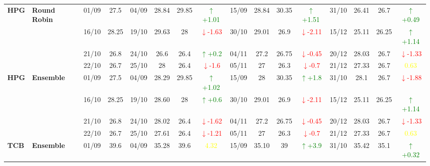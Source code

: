 \documentclass{ieeeaccess}
\begin{document}
{\begin{longtable}{llcc|cccc|cccc|cccc}
\multirow{4}{*}{\textbf{HPG}} 
& \textbf{Round Robin}
& 01/09 & 27.5 & 04/09 & 28.84 & 29.85 & \textcolor{green}{\(\uparrow\)+1.01} & 15/09 & 28.84 & 30.35 & \textcolor{green}{\(\uparrow\)+1.51} & 31/10 & 26.41 & 26.7 & \textcolor{green}{\(\uparrow\)+0.49} \\

& 
& 16/10 & 28.25 & 19/10 & 29.63 & 28 & \textcolor{red}{\(\downarrow\)-1.63} & 30/10 & 29.01 & 26.9 & \textcolor{red}{\(\downarrow\)-2.11} & 15/12 & 25.11 & 26.25 & \textcolor{green}{\(\uparrow\)+1.14} \\

& 
& 21/10 & 26.8 & 24/10 & 26.6 & 26.4 & \textcolor{green}{\(\uparrow\)+0.2} & 04/11 & 27.2 & 26.75 & \textcolor{red}{\(\downarrow\)-0.45} & 20/12 & 28.03 & 26.7 & \textcolor{red}{\(\downarrow\)-1.33} \\

&
& 22/10 & 26.7 & 25/10 & 28 & 26.4 & \textcolor{red}{\(\downarrow\)-1.6} & 05/11 & 27 & 26.3 & \textcolor{red}{\(\downarrow\)-0.7} & 21/12 & 27.33 & 26.7 & \textcolor{yellow}{0.63} \\
\midrule


\multirow{4}{*}{\textbf{HPG}} 
& \textbf{Ensemble}
& 01/09 & 27.5 & 04/09 & 28.29 & 29.85& \textcolor{green}{\(\uparrow\)+1.02} & 15/09 & 28 & 30.35 & \textcolor{green}{\(\uparrow\)+1.8} & 31/10 & 28.1 & 26.7 & \textcolor{red}{\(\downarrow\)-1.88} \\

& 
& 16/10 & 28.25 & 19/10 & 28.60 & 28 & \textcolor{green}{\(\uparrow\)+0.6} & 30/10 & 29.01 & 26.9 & \textcolor{red}{\(\downarrow\)-2.11} & 15/12 & 25.11 & 26.25 & \textcolor{green}{\(\uparrow\)+1.14} \\

& 
& 21/10 & 26.8 & 24/10 & 28.02 & 26.4 & \textcolor{red}{\(\downarrow\)-1.62} & 04/11 & 27.2 & 26.75 & \textcolor{red}{\(\downarrow\)-0.45} & 20/12 & 28.03 & 26.7 & \textcolor{red}{\(\downarrow\)-1.33} \\

&
& 22/10 & 26.7 & 25/10 & 27.61 & 26.4 & \textcolor{red}{\(\downarrow\)-1.21} & 05/11 & 27 & 26.3 & \textcolor{red}{\(\downarrow\)-0.7} & 21/12 & 27.33 & 26.7 & \textcolor{yellow}{0.63} \\
\midrule



\multirow{4}{*}{\textbf{TCB}} 
& \textbf{Ensemble}
& 01/09 & 39.6 & 04/09 & 35.28 & 39.6 & \textcolor{yellow}{4.32} & 15/09 & 35.10 & 39 & \textcolor{green}{\(\uparrow\)+3.9} & 31/10 & 35.42 & 35.1 & \textcolor{green}{\(\uparrow\)+0.32} \\


\end{longtable}}
\end{document}

